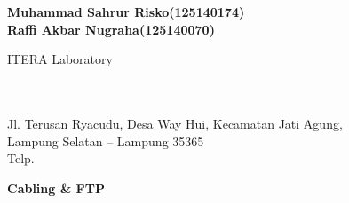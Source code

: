 \documentclass[11pt]{article}
\renewcommand{\praktikumTitle}{Cabling \& FTP}
\renewcommand{\mahasiswaName}{Muhammad Sahrur Risko}
\newcommand{\mahasiswaNameKedua}{Raffi Akbar Nugraha}
\renewcommand{\mahasiswaNIM}{125140174}
\newcommand{\mahasiswaNIMKedua}{125140070}
\begin{document}
\begingroup
\linespread{1.0}\selectfont
\begin{center}
  {\bfseries\fontsize{10}{12}\selectfont
    \mahasiswaName\space (\mahasiswaNIM) \\
    \mahasiswaNameKedua\space (\mahasiswaNIMKedua)\par}

  \vspace{14pt}
  {\fontsize{10}{12}\selectfont
    ITERA Laboratory\\
    \institusiProdi\\
    \institusiFakultas\\
    \institusiKampus\par}

  \vspace{8pt}
  {\fontsize{10}{12}\selectfont
    Jl. Terusan Ryacudu, Desa Way Hui, Kecamatan Jati Agung,\\
    Lampung Selatan -- Lampung 35365\\
    Telp. \institusiTelp\par}

  \vspace{10pt}
  {\bfseries\fontsize{15}{18}\selectfont \praktikumTitle\par}
\end{center}
\endgroup

\newpage

\end{document}
